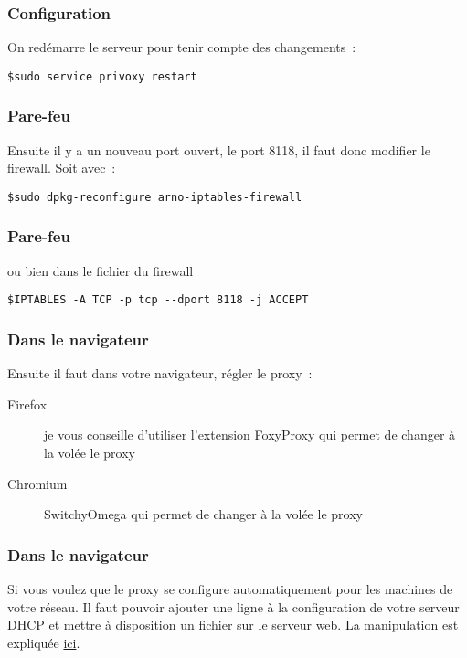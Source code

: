 \begin{frame}[containsverbatim]
\frametitle{Configuration}

On redémarre le serveur pour tenir compte des changements~:
\begin{verbatim}
$sudo service privoxy restart
\end{verbatim}

\end{frame}

\begin{frame}[containsverbatim]
\frametitle{Pare-feu}

Ensuite il y a un nouveau port ouvert, le port 8118, il faut donc modifier le firewall. Soit avec~:
\begin{verbatim}
$sudo dpkg-reconfigure arno-iptables-firewall
\end{verbatim}

\end{frame}

\begin{frame}[containsverbatim]
\frametitle{Pare-feu}

ou bien dans le fichier du firewall

\begin{verbatim}
$IPTABLES -A TCP -p tcp --dport 8118 -j ACCEPT
\end{verbatim}

\end{frame}

\begin{frame}[containsverbatim]
\frametitle{Dans le navigateur}

Ensuite il faut dans votre navigateur, régler le proxy~:
\begin{description}
	\item [Firefox] je vous conseille d'utiliser l'extension FoxyProxy qui permet de changer à la volée le proxy
	\item [Chromium] SwitchyOmega qui permet de changer à la volée le proxy
\end{description}

\end{frame}

\begin{frame}[containsverbatim]
\frametitle{Dans le navigateur}

Si vous voulez que le proxy se configure automatiquement pour les machines de votre réseau. Il faut pouvoir ajouter une ligne à la configuration de votre serveur DHCP et mettre à disposition un fichier sur le serveur web. La manipulation est expliquée \href{https://www.howtoforge.com/squid-proxy-server-on-ubuntu-9.04-server-with-dansguardian-clamav-and-wpad-proxy-auto-detection}{ici}.

\end{frame}

